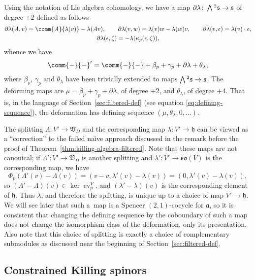 \documentclass[pdftex]{sigma}
\numberwithin{equation}{section}
\newcommand{\fa}{\mathfrak{a}}
\newcommand{\fh}{\mathfrak{h}}
\newcommand{\fs}{\mathfrak{s}}
\newcommand{\fso}{\mathfrak{so}}
\newcommand{\fV}{\mathfrak{V}}
\newcommand{\Wedge}{\mathchoice{{\textstyle\bigwedge}}{\bigwedge}{\bigwedge}{\bigwedge}}	%
\newcommand{\1}{\mathbbm{1}}
\DeclareMathOperator{\evaluate}{ev}
\begin{document}
Using the notation of Lie algebra cohomology, we have a map $\partial\lambda\colon\Wedge^2\fs\to\fs$ of degree $+2$ defined as follows
\begin{gather*}
	\partial\lambda(A,v) = \comm{A}{\lambda(v)}-\lambda(Av),\qquad
	 \partial\lambda(v,w) = \lambda(v)w-\lambda(w)v,\qquad
	\partial\lambda(v,\epsilon)	= \lambda(v)\cdot\epsilon,\\
	 \partial\lambda(\epsilon,\zeta)	= -\lambda(\kappa_p(\epsilon,\zeta)),
\end{gather*}
whence we have
\[
	\comm{-}{-}' = \comm{-}{-} + \beta_p + \gamma_p + \partial\lambda + \theta_\lambda,
\]
where $\beta_p$, $\gamma_p$ and $\theta_\lambda$ have been trivially extended to maps $\Wedge^2\fs\to\fs$. The deforming maps are $\mu = \beta_p + \gamma_p+\partial\lambda$, of degree $+2$, and $\theta_\lambda$, of degree $+4$. That is, in the language of Section~\ref{sec:filtered-def} (see equation \eqref{eq:defining-sequence}), the deformation has defining sequence $(\mu,\theta_\lambda,0,\dots)$.

The splitting $\Lambda\colon V'\to \fV_D$ and the corresponding map $\lambda \colon V'\to\fh$ can be viewed as a ``correction'' to the failed na\"{\i}ve approach discussed in the remark before the proof of Theorem~\ref{thm:killing-algebra-filtered}. Note that these maps are not canonical; if $\Lambda'\colon V'\to\fV_D$ is another splitting and $\lambda'\colon V'\to\fso(V)$ is the corresponding map, we have
\[
	\Phi_p(\Lambda'(v)-\Lambda(v)) = (v-v,\lambda'(v)-\lambda(v)) = (0,\lambda'(v)-\lambda(v)),
\]
so $(\Lambda'-\Lambda)(v)\in\ker\evaluate^V_p$, and $(\lambda'-\lambda)(v)$ is the corresponding element of $\fh$. Thus $\lambda$, and therefore the splitting, is unique up to a choice of map $V'\to\fh$. We will see later that such a~map is a Spencer $(2,1)$-cocycle for $\fa$, so it is consistent that changing the defining sequence by the coboundary of such a map does not change the isomorphism class of the deformation, only its presentation. Also note that this choice of splitting is exactly a choice of complementary submodules as discussed near the beginning of Section~\ref{sec:filtered-def}.

\subsection{Constrained Killing spinors}
\label{sec:alg-kse}
\end{document}
